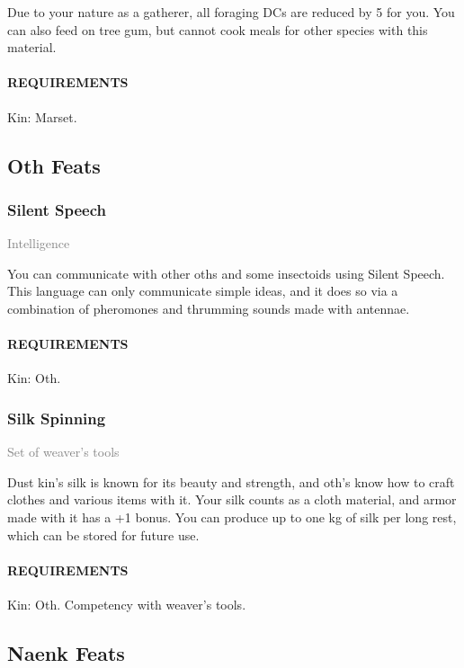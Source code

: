     \normalsize
    Due to your nature as a gatherer, all foraging DCs are reduced by 5 for you.
    You can also feed on tree gum, but cannot cook meals for other species with this material.
    \paragraph{REQUIREMENTS} Kin: Marset.

\subsection*{Oth Feats}
    \subsubsection{Silent Speech} \label{feat::silentspeech}
    \small{\textcolor{gray}{Intelligence}}

    \normalsize
    You can communicate with other oths and some insectoids using Silent Speech.
    This language can only communicate simple ideas, and it does so via a combination of pheromones and thrumming sounds made with antennae.
    \paragraph{REQUIREMENTS} Kin: Oth.

    \subsubsection{Silk Spinning} \label{feat::silkspinning}
    \small{\textcolor{gray}{Set of weaver's tools}}

    \normalsize
    Dust kin's silk is known for its beauty and strength, and oth's know how to craft clothes and various items with it.
    Your silk counts as a cloth material, and armor made with it has a +1 bonus.
    You can produce up to one kg of silk per long rest, which can be stored for future use.
    \paragraph{REQUIREMENTS} Kin: Oth. Competency with weaver's tools.

\subsection*{Naenk Feats}
